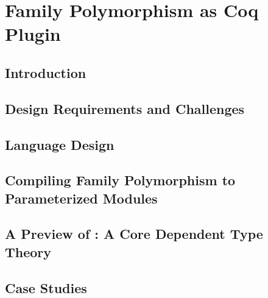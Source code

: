 

\newpage
{}
\setcounter{page}{1}
\chapter{Family Polymorphism as Coq Plugin}

\section{Introduction}
\label{sec:intro}



\section{Design Requirements and Challenges}
\label{sec:background+challenge}


\section{Language Design}
\label{sec:lang-design}


\section{Compiling Family Polymorphism to Parameterized Modules}
\label{sec:coqimpl}


\section{A Preview of \TT: A Core Dependent Type Theory}
\label{sec:metatheory2}



\section{Case Studies}
\label{sec:casestudies}


